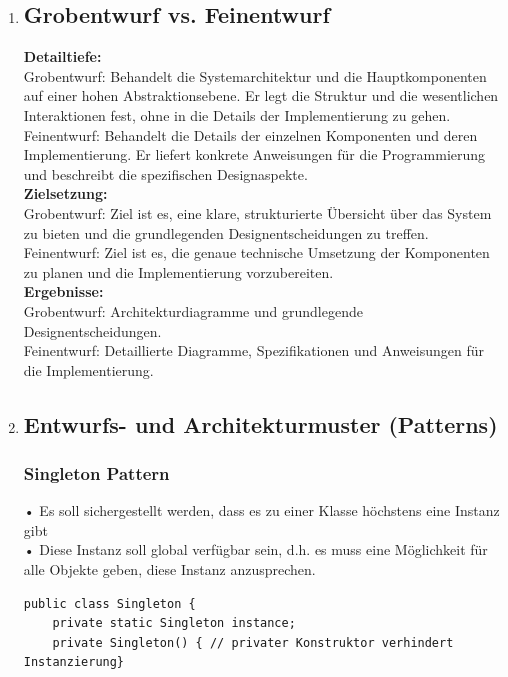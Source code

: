 \documentclass{article}
\begin{document}
\begin{enumerate}[label=\alph*)]
\item \subsection*{Grobentwurf vs. Feinentwurf}
\textbf{Detailtiefe:}\\
Grobentwurf: Behandelt die Systemarchitektur und die Hauptkomponenten auf einer hohen Abstraktionsebene. Er legt die Struktur und die wesentlichen Interaktionen fest, ohne in die Details der Implementierung zu gehen.\\
Feinentwurf: Behandelt die Details der einzelnen Komponenten und deren Implementierung. Er liefert konkrete Anweisungen für die Programmierung und beschreibt die spezifischen Designaspekte.\\
\textbf{Zielsetzung:}\\
Grobentwurf: Ziel ist es, eine klare, strukturierte Übersicht über das System zu bieten und die grundlegenden Designentscheidungen zu treffen.\\
Feinentwurf: Ziel ist es, die genaue technische Umsetzung der Komponenten zu planen und die Implementierung vorzubereiten.\\
\textbf{Ergebnisse:}\\
Grobentwurf: Architekturdiagramme und grundlegende Designentscheidungen.\\
Feinentwurf: Detaillierte Diagramme, Spezifikationen und Anweisungen für die Implementierung.\\

   \item \subsection*{Entwurfs- und Architekturmuster (Patterns)}
   \subsubsection*{Singleton Pattern}
   • Es soll sichergestellt werden, dass es zu einer Klasse höchstens eine Instanz gibt\\
   • Diese Instanz soll global verfügbar sein, d.h. es muss eine Möglichkeit für alle Objekte geben, diese Instanz anzusprechen.
   \begin{lstlisting}
public class Singleton {
    private static Singleton instance;
    private Singleton() { // privater Konstruktor verhindert Instanzierung}
    

\end{lstlisting}
\end{enumerate}
\end{document}
